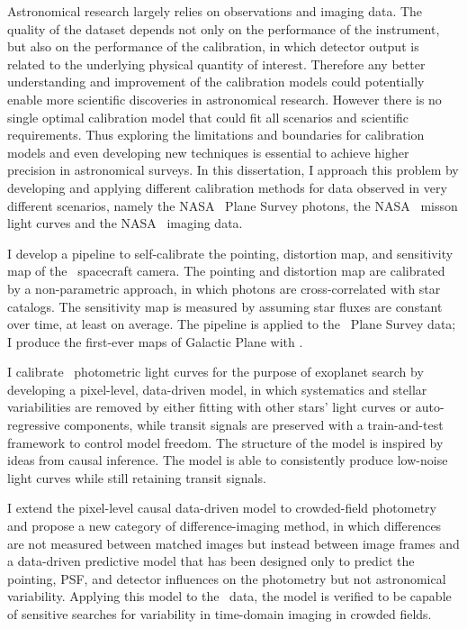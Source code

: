 Astronomical research largely relies on observations and imaging data.
The quality of the dataset depends not only on the performance of the instrument, but also on the performance of the calibration, in which detector output is related to the underlying physical quantity of interest.
Therefore any better understanding and improvement of the calibration models could potentially enable more scientific discoveries in astronomical research.
However there is no single optimal calibration model that could fit all scenarios and scientific requirements.
Thus exploring the limitations and boundaries for calibration models and even developing new techniques is essential to achieve higher precision in astronomical surveys.
In this dissertation, I approach this problem by developing and applying different calibration methods for data observed in very different scenarios, namely the NASA \galex\ Plane Survey photons, the NASA \kepler\ misson light curves and the NASA \KTCN\ imaging data.

I develop a pipeline to self-calibrate the pointing, distortion map, and sensitivity map of the \galex\ spacecraft camera.
The pointing and distortion map are calibrated by a non-parametric approach, in which photons are cross-correlated with star catalogs. 
The sensitivity map is measured by assuming star fluxes are constant over time, at least on average.
The pipeline is applied to the \galex\ Plane Survey data; I produce the first-ever maps of Galactic Plane with \galex.

I calibrate \kepler\ photometric light curves for the purpose of exoplanet search by developing a pixel-level, data-driven model, in which systematics and stellar variabilities are removed by either fitting with other stars' light curves or auto-regressive components, while transit signals are preserved with a train-and-test framework to control model freedom.
The structure of the model is inspired by ideas from causal inference.
The model is able to consistently produce low-noise light curves while still retaining transit signals.

I extend the pixel-level causal data-driven model to crowded-field photometry and propose a new category of difference-imaging method, in which differences are not measured between matched images but instead between image frames and a data-driven predictive model that has been designed only to predict the pointing, PSF, and detector influences on the photometry but not astronomical variability.
Applying this model to the \KTCN\ data, the model is verified to be capable of sensitive searches for variability in time-domain imaging in crowded fields.
